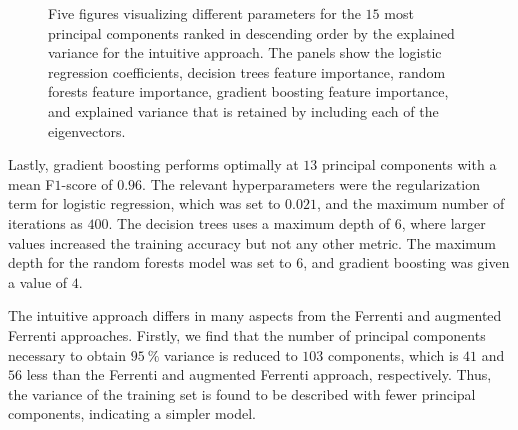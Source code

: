 \documentclass[superscriptaddress,unsortedaddress,
 amsmath,amssymb,
 aps,
]{revtex4-2}
\begin{document}
\begin{figure}[ht!]
  \begin{subfigure}[b]{0.5\textwidth}
    \centering
    
    \label{fig:03-fi-a}
  \end{subfigure}%
  \begin{subfigure}[b]{0.5\textwidth}
    \centering
    
    \label{fig:03-fi-b}
  \end{subfigure}%
  \begin{subfigure}[b]{0.5\textwidth}
    \centering
    
    \label{fig:03-fi-c}
  \end{subfigure}%
  \begin{subfigure}[b]{0.5\textwidth}
    \centering
    
    \label{fig:03-fi-d}
  \end{subfigure}%
  \begin{subfigure}[b]{0.5\textwidth}
    \centering
    
    \label{fig:03-fi-e}
  \end{subfigure}%
  \caption{Five figures visualizing different parameters for the $15$ most principal components ranked in descending order by the explained variance for the intuitive approach. The panels show the logistic regression coefficients, decision trees feature importance, random forests feature importance, gradient boosting feature importance, and explained variance that is retained by including each of the eigenvectors. }
  \label{fig:03-fi}
\end{figure}

Lastly, gradient boosting performs optimally at $13$ principal components with a mean F$1$-score of $0.96$. The relevant hyperparameters were the regularization term for logistic regression, which was set to $0.021$, and the maximum number of iterations as $400$. The decision trees uses a maximum depth of $6$, where larger values increased the training accuracy but not any other metric. The maximum depth for the random forests model was set to $6$, and gradient boosting was given a value of $4$. 

The intuitive approach differs in many aspects from the Ferrenti and augmented Ferrenti approaches. Firstly, we find that the number of principal components necessary to obtain $95 \ \%$ variance is reduced to $103$ components, which is $41$ and $56$ less than the Ferrenti and augmented Ferrenti approach, respectively. Thus, the variance of the training set is found to be described with fewer principal components, indicating a simpler model.   
\end{document}
